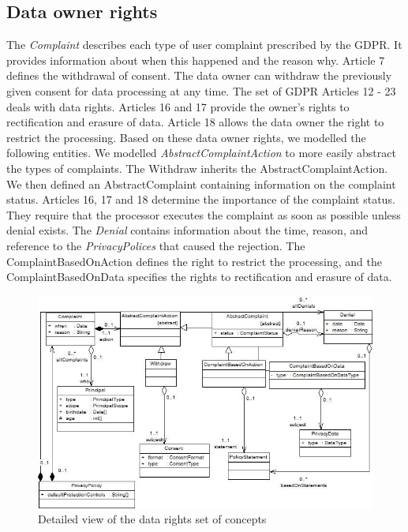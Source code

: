 \documentclass[11pt,english]{article}
\begin{document}
\subsection{Data owner rights}
The \emph{Complaint} describes each type of user complaint prescribed by the GDPR. It provides information about when this happened and the reason why. Article 7 defines the withdrawal of consent. The data owner can withdraw the previously given consent for data processing at any time. The set of GDPR Articles 12 - 23 deals with data rights. Articles 16 and 17 provide the owner's rights to rectification and erasure of data. Article 18 allows the data owner the right to restrict the processing. Based on these data owner rights, we modelled the following entities. \newline We modelled \emph{AbstractComplaintAction} to more easily abstract the types of complaints. The Withdraw inherits the AbstractComplaintAction. We then defined an AbstractComplaint containing information on the complaint status. Articles 16, 17 and 18 determine the importance of the complaint status. They require that the processor executes the complaint as soon as possible unless denial exists. The \emph{Denial} contains information about the time, reason, and reference to the \emph{PrivacyPolices} that caused the rejection. The ComplaintBasedOnAction defines the right to restrict the processing, and the ComplaintBasedOnData specifies the rights to rectification and erasure of data.
\begin{figure}[H]
    \centering
    \includegraphics[width=12.5cm]{images/dataRights.jpg}
    \caption{Detailed view of the data rights set of concepts}
    \label{fig:DataRights}
\end{figure}
\end{document}
